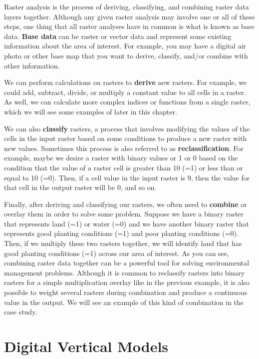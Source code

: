 \documentclass[
]{book}
\begin{document}
Raster analysis is the process of deriving, classifying, and combining raster data layers together. Although any given raster analysis may involve one or all of these steps, one thing that all raster analyses have in common is what is known as base data. \textbf{Base data} can be raster or vector data and represent some existing information about the area of interest. For example, you may have a digital air photo or other base map that you want to derive, classify, and/or combine with other information.

We can perform calculations on rasters to \textbf{derive} new rasters. For example, we could add, subtract, divide, or multiply a constant value to all cells in a raster. As well, we can calculate more complex indices or functions from a single raster, which we will see some examples of later in this chapter.

We can also \textbf{classify} rasters, a process that involves modifying the values of the cells in the input raster based on some conditions to produce a new raster with new values. Sometimes this process is also referred to as \textbf{reclassification}. For example, maybe we desire a raster with binary values or 1 or 0 based on the condition that the value of a raster cell is greater than 10 (=1) or less than or equal to 10 (=0). Then, if a cell value in the input raster is 9, then the value for that cell in the output raster will be 0, and so on.

Finally, after deriving and classifying our rasters, we often need to \textbf{combine} or overlay them in order to solve some problem. Suppose we have a binary raster that represents land (=1) or water (=0) and we have another binary raster that represents good planting conditions (=1) and poor planting conditions (=0). Then, if we multiply these two rasters together, we will identify land that has good planting conditions (=1) across our area of interest. As you can see, combining raster data together can be a powerful tool for solving environmental management problems. Although it is common to reclassify rasters into binary rasters for a simple multiplication overlay like in the previous example, it is also possible to weight several rasters during combination and produce a continuous value in the output. We will see an example of this kind of combination in the case study.

\hypertarget{digital-vertical-models}{%
\section{Digital Vertical Models}\label{digital-vertical-models}}
\end{document}
